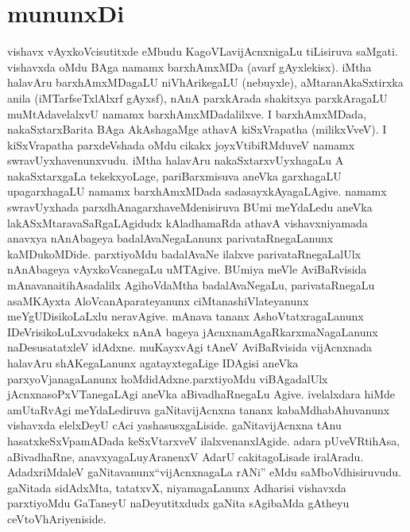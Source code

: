 \chapter*{mununxDi}

\qquad vishavx vAyxkoVcisutitxde eMbudu KagoVLavijAcnxnigaLu tiLisiruva saMgati. vishavxda oMdu BAga namamx barxhAmxMDa (avarf gAyxlekisx). iMtha halavAru barxhAmxMDagaLU niVhArikegaLU (nebuyxle), aMtaranAkaSxtirxka anila (iMTarfseTxlAlxrf gAyxsf), nAnA parxkArada shakitxya parxkAragaLU muMtAdavelalxvU namamx barxhAmxMDadalilxve. I barxhAmxMDa\-da, nakaSxtarxBarita BAga AkAshagaMge athavA kiSxVrapatha (milikxVveV). I kiSxVrapatha parxdeVsha\-da oMdu cikakx joyxVtibiRMduveV namamx swravUyxhavenunxvudu. iMtha halavAru nakaSxtarxvUyxhagaLu A nakaSxtarxgaLa tekekxyoLage, pariBarxmisuva aneVka garxhagaLU upa\break garxhagaLU namamx barxhAmxMDada sadasayxkAyagaLAgive. namamx swravUyxhada parxdhAna\break garxhaveMdenisiruva BUmi meYdaLedu aneVka lakASxMtaravaSaRgaLAgidudx kAladhamaR\-da athavA vishavxniyamada anavxya nAnAbageya badalAvaNegaLanunx parivataRnegaLanunx kaMDukoMDide. parxtiyoMdu badalAvaNe ilalxve parivataRnegaLalUlx nAnA\break bageya vAyxkoVcanegaLu uMTAgive. BUmiya meVle AviBaRvisida mAnavana\break itihAsadalilx AgihoVdaMtha badalAvaNegaLu, parivataRnegaLu asaMKAyxta AloVcanAparateyanunx ciMtanashiVlateyanunx meYgUDisikoLaLxlu neravAgive.  mAnava\- tananx AshoVtatxragaLanunx IDeVrisikoLuLxvudakekx nAnA bageya jAcnxnamAgaRkarxmaNagaLanunx naDesusatatxleV idAdxne. muKayxvAgi tAneV AviBaRvisida vijAcnxnada halavAru shAKegaLanunx agatayxtegaLige IDAgisi aneVka parxyoVjanagaLanunx hoMdidAdxne.\break parxtiyoMdu viBAgadalUlx jAcnxnasoPxVTanegaLAgi aneVka aBivadhaRnegaLu Agive. ivelalxdara hiMde amUtaRvAgi meYdaLediruva gaNitavijAcnxna tananx kabaMdhabAhuvanunx vishavxda elelxDeyU cAci yashasusxgaLiside. gaNitavijAcnxna tAnu hasatxkeSxVpamADada keSxVtarxveV ilalxvenanxlAgide. adara pUveVRtihAsa, aBivadhaRne, anavxyagaLu\break yAranenxV AdarU cakitagoLisade iralAradu. AdadxriMdaleV gaNitavanunx\break ``vijAcnxnagaLa rANi'' eMdu saMboVdhisiruvudu. gaNitada sidAdxMta, tatatxvX, niyama\-gaLanunx Adharisi vishavxda parxtiyoMdu GaTaneyU naDeyutitxdudx gaNita sAgibaMda gAtheyu ceVtoVhAriyeniside.

\bigskip

